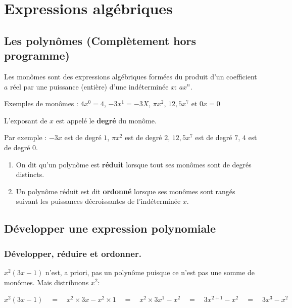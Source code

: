 \documentclass[a4paper,10pt]{report}
\begin{document}
\newpage
\setcounter{chapter}{6}
\chapter{Expressions algébriques}

\section{Les polynômes (Complètement hors programme)}

\begin{defn}
Les monômes sont des expressions algébriques formées du produit d'un coefficient $a$ réel par une puissance (entière) d'une indéterminée $x$: $ax^n$. 
\end{defn}

\medskip
\noindent Exemples de monômes : \quad $4x^0=4$, \quad $-3x^1=-3X$, \quad $\pi x^2$, \quad $12,5x^7$ \quad et \quad $0x=0$ 

\medskip
\noindent L'exposant de $x$ est appelé le \textbf{degré} du monôme. 

\medskip
\noindent Par exemple :  \quad $-3x$ est de degré $1$, \quad $\pi x^2$ est de degré $2$, \quad $12,5x^7$ est de degré $7$, \quad $4$ est de degré $0$.

\begin{memento}
\begin{enumerate}
\item[•] On dit qu'un polynôme est \textbf{réduit} lorsque tout ses monômes sont de degrés distincts. 
\item[•] Un polynôme réduit est dit \textbf{ordonné} lorsque ses monômes sont rangés suivant les puissances décroissantes de l'indéterminée $x$. 
\end{enumerate}
\end{memento}

\section{Développer une expression polynomiale}

\subsection{Développer, réduire et ordonner.}

\noindent $x^2(3x-1)$ n'est, a priori, pas un polynôme puisque ce n'est pas une somme de monômes. Mais distribuons $x^2$:

\begin{center}
$ x^2(3x-1) \quad = \quad x^2\times 3x-x^2\times 1 \quad = \quad x^2\times 3x^1-x^2 \quad = \quad 3x^{2+1}-x^2 \quad = \quad 3x^3-x^2$
\end{center}
\end{document}
